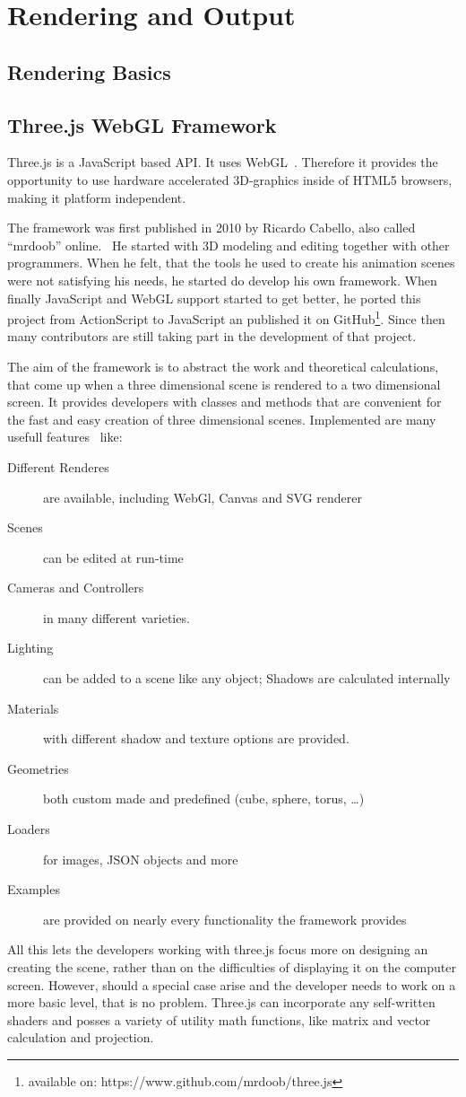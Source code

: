 \section{Rendering and Output}
\subsection{Rendering Basics}
\subsection{Three.js WebGL Framework}
Three.js is a JavaScript based API\@. It uses WebGL~\cite{WebGL}. Therefore it provides the opportunity to use hardware accelerated 3D-graphics inside of HTML5 browsers, making it platform independent.

The framework was first published in 2010 by Ricardo Cabello, also called {``mrdoob''} online.~\cite{ThreeWhite} He started with 3D modeling and editing together with other programmers. When he felt, that the tools he used to create his animation scenes were not satisfying his needs, he started do develop his own framework. When finally JavaScript and WebGL support started to get better, he ported this project from ActionScript to JavaScript an published it on GitHub\footnote{available on: https://www.github.com/mrdoob/three.js}. Since then many contributors are still taking part in the development of that project.

The aim of the framework is to abstract the work and theoretical calculations, that come up when a three dimensional scene is rendered to a two dimensional screen. It provides developers with classes and methods that are convenient for the fast and easy creation of three dimensional scenes. Implemented are many usefull features~\cite{ThreeFeatures} like:
\begin{description}
\item[Different Renderes] are available, including WebGl, Canvas and SVG renderer
\item[Scenes] can be edited at run-time
\item[Cameras and Controllers] in many different varieties.
\item[Lighting] can be added to a scene like any object; Shadows are calculated internally
\item[Materials] with different shadow and texture options are provided.
\item[Geometries] both custom made and predefined (cube, sphere, torus, \ldots)
\item[Loaders] for images, JSON objects and more
\item[Examples] are provided on nearly every functionality the framework provides
\end{description}
All this lets the developers working with three.js focus more on designing an creating the scene, rather than on the difficulties of displaying it on the computer screen. However, should a special case arise and the developer needs to work on a more basic level, that is no problem. Three.js can incorporate any self-written shaders and posses a variety of utility math functions, like matrix and vector calculation and projection.

